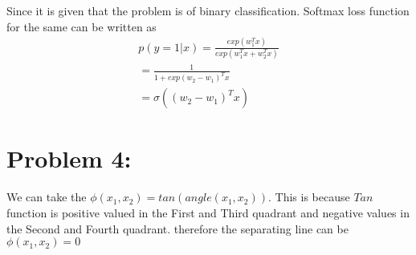 \documentclass[5pt,a4paper]{article}
\begin{document}
	Since it is given that the problem is of binary classification. Softmax loss function for the same can be written as 
	\begin{eqnarray}
	p(y = 1| x) = \frac{exp(w_1^Tx)}{exp(w_1^Tx + w_2^Tx)}\\=\frac{1}{1+exp(w_2-w_1)^Tx}\\=\sigma((w_2-w_1)^Tx)
	\end{eqnarray}
	\section*{Problem 4:}
	We can take the $\phi(x_1,x_2)=tan(angle(x_1,x_2))$. This is because $Tan$ function is positive valued in the First and Third quadrant and negative values in the Second and Fourth quadrant. therefore the separating line can be $\phi(x_1,x_2)=0$  
	
\end{document}
